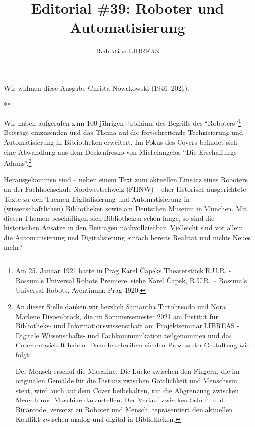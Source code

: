 \documentclass[a4paper,
fontsize=11pt,
oneside,
numbers=noperiodatend,
parskip=half-,
bibliography=totoc,
final
]{scrartcl}
\title{\LARGE{Editorial \#39: Roboter und Automatisierung}}%
\author{Redaktion LIBREAS} %
\date{}
\begin{document}
\maketitle
\thispagestyle{fancyplain} 


{\par \centering Wir widmen diese Ausgabe Christa Nowakowski (1946--2021).\par}

{\par \centering ***\par}

Wir haben aufgerufen zum 100-jährigen Jubiläum des Begriffs des
\enquote{Roboters}\footnote{Am 25. Januar 1921 hatte in Prag Karel
  Čapeks Theaterstück R.U.R. - Rossum's Universal Robots Premiere, siehe
  Karel Čapek, R.U.R. -- Rossum's Universal Robots, Aventinum: Prag
  1920.} Beiträge einzusenden und das Thema auf die fortschreitende
Technisierung und Automatisierung in Bibliotheken erweitert. Im Fokus
des Covers befindet sich eine Abwandlung aus dem Deckenfresko von
Michelangelos \enquote{Die Erschaffungs Adams}.\footnote{An dieser
  Stelle danken wir herzlich Samantha Tirtohusodo und Nora Marlene
  Diepenbrock, die im Sommersemester 2021 am Institut für Bibliotheks-
  und Informationswissenschaft am Projektseminar LIBREAS - Digitale
  Wissenschafts- und Fachkommunikation teilgenommen und das Cover
  entwickelt haben. Dazu beschreiben sie den Prozess der Gestaltung wie
  folgt:

  Der Mensch erschuf die Maschine. Die Lücke zwischen den Fingern, die
  im originalen Gemälde für die Distanz zwischen Göttlichkeit und
  Menschsein steht, wird auch auf dem Cover beibehalten, um die
  Abgrenzung zwischen Mensch und Maschine darzustellen. Der Verlauf
  zwischen Schrift und Binärcode, versetzt zu Roboter und Mensch,
  repräsentiert den aktuellen Konflikt zwischen analog und digital in
  Bibliotheken.}

Herausgekommen sind -- neben einem Text zum aktuellen Einsatz eines
Roboters an der Fachhochschule Nordwestschweiz (FHNW) -- eher historisch
ausgerichtete Texte zu den Themen Digitalisierung und Automatisierung in
(wissenschaftlichen) Bibliotheken sowie am Deutschen Museum in München.
Mit diesen Themen beschäftigen sich Bibliotheken schon lange, so sind
die historischen Ansätze in den Beiträgen nachvollziehbar. Vielleicht
sind vor allem die Automatisierung und Digitalisierung einfach bereits
Realität und nichts Neues mehr?
\end{document}
